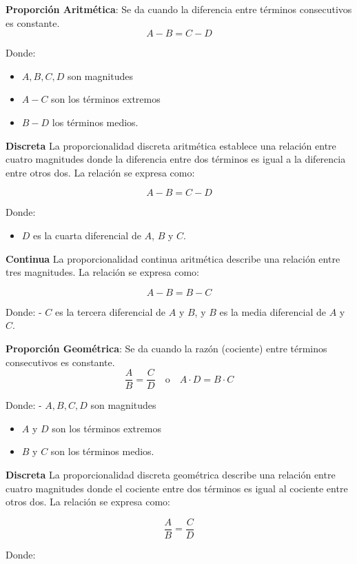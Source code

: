 \documentclass[
  stu,
  floatsintext,
  longtable,
  a4paper,
  nolmodern,
  notxfonts,
  notimes,
  12pt,
  colorlinks=true,linkcolor=blue,citecolor=blue,urlcolor=blue]{apa7}
\providecommand{\tightlist}{%
  \setlength{\itemsep}{0pt}\setlength{\parskip}{0pt}}
\begin{document}
\textbf{Proporción Aritmética}: Se da cuando la diferencia entre
términos consecutivos es constante. \[
  A - B = C - D
  \]

Donde:

\begin{itemize}
\item
  \(A, B, C, D\) son magnitudes
\item
  \(A-C\) son los términos extremos
\item
  \(B-D\) los términos medios.
\end{itemize}

\textbf{Discreta} La proporcionalidad discreta aritmética establece una
relación entre cuatro magnitudes donde la diferencia entre dos términos
es igual a la diferencia entre otros dos. La relación se expresa como:

\[
A - B = C - D
\]

Donde:

\begin{itemize}
\tightlist
\item
  \(D\) es la cuarta diferencial de \(A\), \(B\) y \(C\).
\end{itemize}

\textbf{Continua} La proporcionalidad continua aritmética describe una
relación entre tres magnitudes. La relación se expresa como:

\[
A - B = B - C
\]

Donde: - \(C\) es la tercera diferencial de \(A\) y \(B\), y \(B\) es la
media diferencial de \(A\) y \(C\).

\textbf{Proporción Geométrica}: Se da cuando la razón (cociente) entre
términos consecutivos es constante. \[
  \frac{A}{B} = \frac{C}{D} \quad \text{o} \quad A \cdot D = B \cdot C
  \]

Donde: - \(A, B, C, D\) son magnitudes

\begin{itemize}
\item
  \(A\) y \(D\) son los términos extremos
\item
  \(B\) y \(C\) son los términos medios.
\end{itemize}

\textbf{Discreta} La proporcionalidad discreta geométrica describe una
relación entre cuatro magnitudes donde el cociente entre dos términos es
igual al cociente entre otros dos. La relación se expresa como:

\[
\frac{A}{B} = \frac{C}{D}
\]

Donde:
\end{document}
